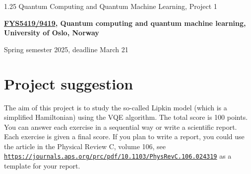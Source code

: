 \documentclass[%
oneside,                 %
final,                   %
10pt]{article}
\begin{document}

\newcommand{\exercisesection}[1]{\subsection*{#1}}






\thispagestyle{empty}

\begin{center}
{\LARGE\bf
\begin{spacing}{1.25}
Quantum Computing and Quantum Machine Learning, Project 1
\end{spacing}
}
\end{center}


\begin{center}
{\bf \href{{https://www.uio.no/studier/emner/matnat/fys/FYS5419/index-eng.html}}{FYS5419/9419}, Quantum computing and quantum machine learning, University of Oslo, Norway${}^{}$} \\ [0mm]
\end{center}

\begin{center}
\end{center}
    

\begin{center}
Spring semester 2025, deadline March 21
\end{center}

\vspace{1cm}


\section*{Project suggestion}

The aim of this project is to study the so-called Lipkin model (which is a simplified Hamiltonian) using the VQE algorithm.
The total score is 100 points. You can answer each exercise in a sequential way or write a scientific report. Each exercise is given a final score.
If you plan to write a report, you could use the article in the Physical Review C, volume 106, see \href{{https://journals.aps.org/prc/pdf/10.1103/PhysRevC.106.024319}}{\nolinkurl{https://journals.aps.org/prc/pdf/10.1103/PhysRevC.106.024319}} as a template for your report.
\end{document}
